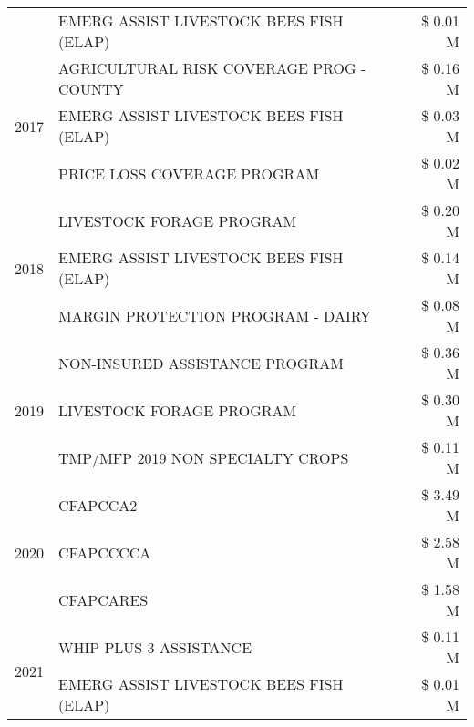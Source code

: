 \begin{tabular}{llr}
 & EMERG ASSIST LIVESTOCK BEES FISH (ELAP) & \$ 0.01 M \\
\cline{1-3}
\multirow[t]{3}{*}{2017} & AGRICULTURAL RISK COVERAGE PROG - COUNTY & \$ 0.16 M \\
 & EMERG ASSIST LIVESTOCK BEES FISH (ELAP) & \$ 0.03 M \\
 & PRICE LOSS COVERAGE PROGRAM & \$ 0.02 M \\
\cline{1-3}
\multirow[t]{3}{*}{2018} & LIVESTOCK FORAGE PROGRAM & \$ 0.20 M \\
 & EMERG ASSIST LIVESTOCK BEES FISH (ELAP) & \$ 0.14 M \\
 & MARGIN PROTECTION PROGRAM - DAIRY & \$ 0.08 M \\
\cline{1-3}
\multirow[t]{3}{*}{2019} & NON-INSURED ASSISTANCE PROGRAM & \$ 0.36 M \\
 & LIVESTOCK FORAGE PROGRAM & \$ 0.30 M \\
 & TMP/MFP 2019 NON SPECIALTY CROPS & \$ 0.11 M \\
\cline{1-3}
\multirow[t]{3}{*}{2020} & CFAPCCA2 & \$ 3.49 M \\
 & CFAPCCCCA & \$ 2.58 M \\
 & CFAPCARES & \$ 1.58 M \\
\cline{1-3}
\multirow[t]{2}{*}{2021} & WHIP PLUS 3 ASSISTANCE & \$ 0.11 M \\
 & EMERG ASSIST LIVESTOCK BEES FISH (ELAP) & \$ 0.01 M \\
\cline{1-3}
\bottomrule
\end{tabular}
